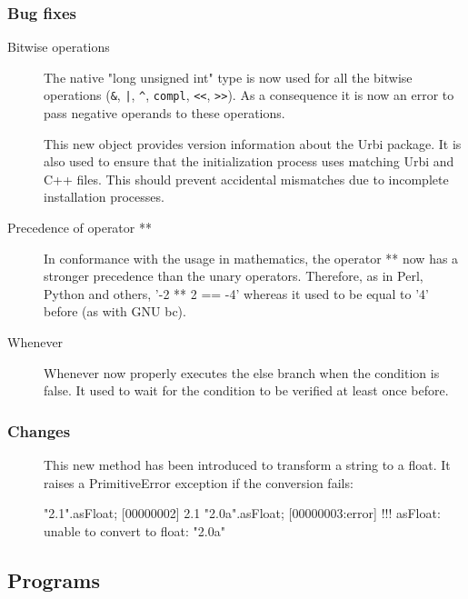 \subsubsection{Bug fixes}

\begin{description}
\item[Bitwise operations] The native "long unsigned int" type is now
  used for all the bitwise operations (\lstinline|&|, \lstinline{|},
  \lstinline|^|, \lstinline|compl|, \lstinline|<<|, \lstinline|>>|).
  As a consequence it is now an error to pass negative operands to
  these operations.

\item[] This new object provides version
  information about the Urbi package.  It is also used to ensure that the
  initialization process uses matching Urbi and C++ files.  This should
  prevent accidental mismatches due to incomplete installation processes.

\item[Precedence of operator **] In conformance with the usage in
  mathematics, the operator ** now has a stronger precedence than the
  unary operators.  Therefore, as in Perl, Python and others, '-2 ** 2
  == -4' whereas it used to be equal to '4' before (as with GNU bc).

\item[Whenever] Whenever now properly executes the else branch when
  the condition is false.  It used to wait for the condition to be
  verified at least once before.
\end{description}

\subsubsection{Changes}

\begin{description}
\item[] This new method has been introduced to transform
  a string to a float.  It raises a PrimitiveError exception if the
  conversion fails:

\begin{urbiscript}
"2.1".asFloat;
[00000002] 2.1
"2.0a".asFloat;
[00000003:error] !!! asFloat: unable to convert to float: "2.0a"
\end{urbiscript}
\end{description}

\subsection{Programs}

